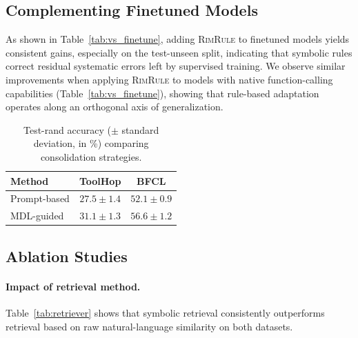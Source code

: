 \documentclass[11pt]{article}
\newcommand{\unseen}{{test-unseen}\xspace}
\newcommand{\shortname}{\textsc{RimRule}\xspace}
\begin{document}




\subsection{Complementing Finetuned Models}


As shown in Table~\ref{tab:vs_finetune}, adding \shortname to finetuned models yields consistent
gains, especially on the \unseen split, indicating that symbolic rules correct residual
systematic errors left by supervised training. We observe similar improvements when applying
\shortname to models with native function-calling capabilities (Table~\ref{tab:vs_finetune}),
showing that rule-based adaptation operates along an orthogonal axis of generalization.




\begin{table}[t]
\small
\caption{Test-rand accuracy ($\pm$ standard deviation, in \%) comparing consolidation strategies.}
\vspace{0.5em}
\label{tab:consolid}
\centering
\renewcommand{\arraystretch}{1.25}
\begin{tabular}{@{}lcc@{}}
\toprule
\textbf{Method} & \textbf{ToolHop} & \textbf{BFCL} \\
\midrule
Prompt-based 
& $27.5 \scriptstyle \pm 1.4$
& $52.1 \scriptstyle \pm 0.9$ \\
MDL-guided 
& $\mathbf{31.1} \scriptstyle \pm 1.3$ 
& $\mathbf{56.6} \scriptstyle \pm 1.2$ \\
\bottomrule
\end{tabular}
\end{table}




\subsection{Ablation Studies}

\paragraph{Impact of retrieval method.}
Table~\ref{tab:retriever} shows that symbolic retrieval consistently outperforms retrieval
based on raw natural-language similarity on both datasets.
\end{document}
